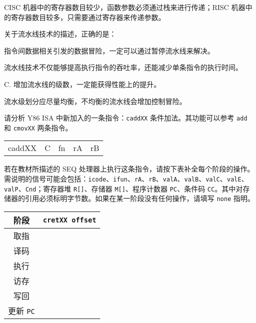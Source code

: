 \begin{problems}
\begin{choices}
            \item CISC 机器中的寄存器数目较少，函数参数必须通过栈来进行传递；RISC 机器中的寄存器数目较多，只需要通过寄存器来传递参数。
        \end{choices}
         关于流水线技术的描述，正确的是：
        \begin{choices}
            \item 指令间数据相关引发的数据冒险，一定可以通过暂停流水线来解决。
            \item 流水线技术不仅能够提高执行指令的吞吐率，还能减少单条指令的执行时间。
            \item C. 增加流水线的级数，一定能获得性能上的提升。
            \item 流水级划分应尽量均衡，不均衡的流水线会增加控制冒险。
        \end{choices}
         请分析 Y86 ISA 中新加入的一条指令：\verb|caddXX| 条件加法。其功能可以参考 \verb|add| 和 \verb|cmovXX| 两条指令。
        \begin{table}[H]
            \centering
            \begin{tabular}{c|c|c|c|c|}
                \cline{2-5}
                caddXX & C & fn & rA & rB \\ \cline{2-5} 
            \end{tabular}
        \end{table}

        若在教材所描述的 SEQ 处理器上执行这条指令，请按下表补全每个阶段的操作。需说明的信号可能会包括：\verb|icode|、\verb|ifun|、\verb|rA|、\verb|rB|、\verb|valA|、\verb|valB|、\verb|valC|、\verb|valE|、\verb|valP|、\verb|Cnd|；寄存器堆 \verb|R[]|、存储器 \verb|M[]|、程序计数器 \verb|PC|、条件码 \verb|CC|。其中对存储器的引用必须标明字节数。如果在某一阶段没有任何操作，请填写 \texttt{none} 指明。
        \begin{table}[H]
            \centering
            \begin{tabular}{|c|c|}
                \hline
                阶段 & {\qquad \qquad \qquad \qquad} \verb|cretXX offset| {\qquad \qquad \qquad \qquad} \\ \hline
                取指 & \rule{0pt}{10ex} \\ \hline
                译码 & \rule{0pt}{10ex} \\ \hline
                执行 & \rule{0pt}{10ex} \\ \hline
                访存 & \rule{0pt}{10ex} \\ \hline
                写回 & \rule{0pt}{10ex} \\ \hline
                更新 \verb|PC| & \rule{0pt}{10ex} \\ \hline
            \end{tabular}
        \end{table}
    \end{problems}